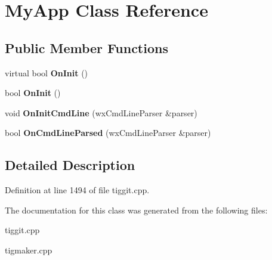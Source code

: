 \hypertarget{class_my_app}{\section{My\-App Class Reference}
\label{class_my_app}
}
\subsection*{Public Member Functions}
\begin{DoxyCompactItemize}
\item 
\hypertarget{class_my_app_a1d2cf26494945ce12930ede58f0261e7}{virtual bool {\bfseries On\-Init} ()}\label{class_my_app_a1d2cf26494945ce12930ede58f0261e7}

\item 
\hypertarget{class_my_app_a79fa75d1155f0e85e20f2869538296d6}{bool {\bfseries On\-Init} ()}\label{class_my_app_a79fa75d1155f0e85e20f2869538296d6}

\item 
\hypertarget{class_my_app_a0737f74bb2a29ce1ab637177cff9b9cf}{void {\bfseries On\-Init\-Cmd\-Line} (wx\-Cmd\-Line\-Parser \&parser)}\label{class_my_app_a0737f74bb2a29ce1ab637177cff9b9cf}

\item 
\hypertarget{class_my_app_ac9629e2b065ee07c7d7475b5e3727d31}{bool {\bfseries On\-Cmd\-Line\-Parsed} (wx\-Cmd\-Line\-Parser \&parser)}\label{class_my_app_ac9629e2b065ee07c7d7475b5e3727d31}

\end{DoxyCompactItemize}


\subsection{Detailed Description}


Definition at line 1494 of file tiggit.\-cpp.



The documentation for this class was generated from the following files\-:\begin{DoxyCompactItemize}
\item 
tiggit.\-cpp\item 
tigmaker.\-cpp\end{DoxyCompactItemize}
